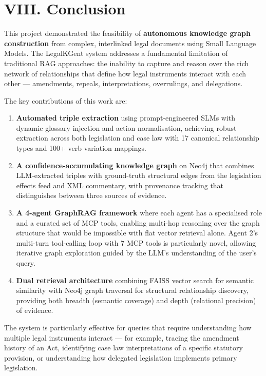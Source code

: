 \documentclass[10pt, a4paper, twocolumn]{article}
\begin{document}
\section{VIII. Conclusion}

This project demonstrated the feasibility of \textbf{autonomous knowledge graph construction} from complex, interlinked legal documents using Small Language Models. The LegalKGent system addresses a fundamental limitation of traditional RAG approaches: the inability to capture and reason over the rich network of relationships that define how legal instruments interact with each other — amendments, repeals, interpretations, overrulings, and delegations.

The key contributions of this work are:

\begin{enumerate}
    \item \textbf{Automated triple extraction} using prompt-engineered SLMs with dynamic glossary injection and action normalisation, achieving robust extraction across both legislation and case law with 17 canonical relationship types and 100+ verb variation mappings.
    \item \textbf{A confidence-accumulating knowledge graph} on Neo4j that combines LLM-extracted triples with ground-truth structural edges from the legislation effects feed and XML commentary, with provenance tracking that distinguishes between three sources of evidence.
    \item \textbf{A 4-agent GraphRAG framework} where each agent has a specialised role and a curated set of MCP tools, enabling multi-hop reasoning over the graph structure that would be impossible with flat vector retrieval alone. Agent 2's multi-turn tool-calling loop with 7 MCP tools is particularly novel, allowing iterative graph exploration guided by the LLM's understanding of the user's query.
    \item \textbf{Dual retrieval architecture} combining FAISS vector search for semantic similarity with Neo4j graph traversal for structural relationship discovery, providing both breadth (semantic coverage) and depth (relational precision) of evidence.
\end{enumerate}

The system is particularly effective for queries that require understanding how multiple legal instruments interact — for example, tracing the amendment history of an Act, identifying case law interpretations of a specific statutory provision, or understanding how delegated legislation implements primary legislation.
\end{document}
